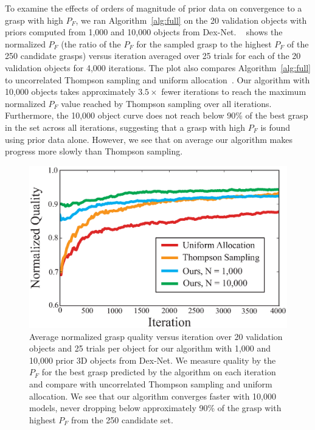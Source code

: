 To examine the effects of orders of magnitude of prior data on convergence to a grasp with high $P_F$, we ran Algorithm~\ref{alg:full} on the 20 validation objects with priors computed from 1,000 and 10,000 objects from Dex-Net. 
~ shows the normalized $P_F$ (the ratio of the $P_F$ for the sampled grasp to the highest $P_F$ of the 250 candidate grasps) versus iteration averaged over 25 trials for each of the 20 validation objects for 4,000 iterations.
The plot also compares Algorithm~\ref{alg:full} to uncorrelated Thompson sampling and uniform allocation~\cite{laskey2015bandits}.
Our algorithm with 10,000 objects takes approximately $3.5\times$ fewer iterations to reach the maximum normalized $P_F$ value reached by Thompson sampling over all iterations.
Furthermore, the 10,000 object curve does not reach below 90\% of the best grasp in the set across all iterations, suggesting that a grasp with high $P_F$ is found using prior data alone.
However, we see that on average our algorithm makes progress more slowly than Thompson sampling.

\begin{figure}[t!]
\centering
\includegraphics[scale=0.45]{figures/illustrations/avg_reward.eps}
\caption{Average normalized grasp quality versus iteration over 20 validation objects and 25 trials per object for our algorithm with 1,000 and 10,000 prior 3D objects from Dex-Net. We measure quality by the $P_F$ for the best grasp predicted by the algorithm on each iteration and compare with uncorrelated Thompson sampling and uniform allocation. We see that our algorithm converges faster with 10,000 models, never dropping below approximately 90\% of the grasp with highest $P_F$ from the 250 candidate set.}
\vspace*{-15pt}
\end{figure}

